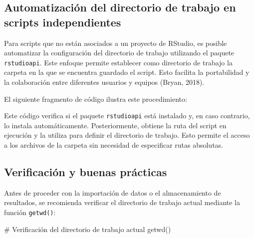 \documentclass[
  spanish,
  a4paper,
  DIV=11,
  numbers=noendperiod,
  onepage,
  openany]{scrreprt}
\newenvironment{Shaded}{\begin{snugshade}}{\end{snugshade}}
\newcommand{\CommentTok}[1]{\textcolor[rgb]{0.37,0.37,0.37}{#1}}
\newcommand{\ControlFlowTok}[1]{\textcolor[rgb]{0.00,0.23,0.31}{\textbf{#1}}}
\newcommand{\FunctionTok}[1]{\textcolor[rgb]{0.28,0.35,0.67}{#1}}
\newcommand{\NormalTok}[1]{\textcolor[rgb]{0.00,0.23,0.31}{#1}}
\newcommand{\SpecialCharTok}[1]{\textcolor[rgb]{0.37,0.37,0.37}{#1}}
\newcommand{\StringTok}[1]{\textcolor[rgb]{0.13,0.47,0.30}{#1}}
\begin{document}
\subsection{Automatización del directorio de trabajo en scripts
independientes}\label{automatizaciuxf3n-del-directorio-de-trabajo-en-scripts-independientes}

Para scripts que no están asociados a un proyecto de RStudio, es posible
automatizar la configuración del directorio de trabajo utilizando el
paquete \texttt{rstudioapi}. Este enfoque permite establecer como
directorio de trabajo la carpeta en la que se encuentra guardado el
script. Esto facilita la portabilidad y la colaboración entre diferentes
usuarios y equipos (Bryan, 2018).

El siguiente fragmento de código ilustra este procedimiento:

\begin{Shaded}
\end{Shaded}

Este código verifica si el paquete \texttt{rstudioapi} está instalado y,
en caso contrario, lo instala automáticamente. Posteriormente, obtiene
la ruta del script en ejecución y la utiliza para definir el directorio
de trabajo. Esto permite el acceso a los archivos de la carpeta sin
necesidad de especificar rutas absolutas.

\subsection{Verificación y buenas
prácticas}\label{verificaciuxf3n-y-buenas-pruxe1cticas}

Antes de proceder con la importación de datos o el almacenamiento de
resultados, se recomienda verificar el directorio de trabajo actual
mediante la función \texttt{getwd()}:

\begin{Shaded}
\begin{Highlighting}[]
\CommentTok{\# Verificación del directorio de trabajo actual}
\FunctionTok{getwd}\NormalTok{()}
\end{Highlighting}
\end{Shaded}
\end{document}
